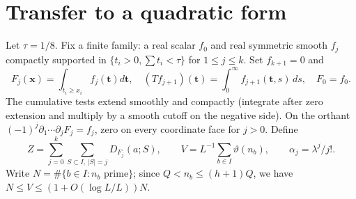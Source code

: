 \documentclass[11pt]{article}
\begin{document}
\section{Transfer to a quadratic form}
Let $\tau=1/8$. Fix a finite family: a real scalar $f_0$ and real
symmetric smooth $f_j$ compactly supported in
$\{t_i>0,\sum t_i<\tau\}$ for $1\le j\le k$. Set $f_{k+1}=0$ and
\[
 F_j(\mathbf x)=\int_{t_i\ge x_i}f_j(\mathbf t)d\mathbf t,\quad
 (Tf_{j+1})(\mathbf t)=\int_0^\infty f_{j+1}(\mathbf t,s)\,ds,
 \quad F_0=f_0.
\]
The cumulative tests extend smoothly and compactly (integrate after
zero extension and multiply by a smooth cutoff on the negative side).
On the orthant $(-1)^j\partial_1\cdots\partial_jF_j=f_j$, zero on
every coordinate face for $j>0$. Define
\[
 Z=\sum_{j=0}^k\sum_{S\subset I,\,|S|=j}D_{F_j}(a;S),\qquad
 V=L^{-1}\sum_{b\in I}\vartheta(n_b),\qquad \alpha_j=\lambda^j/j!.
\]
Write $N=\#\{b\in I:n_b\text{ prime}\}$; since
$Q<n_b\le(h+1)Q$, we have $N\le V\le(1+O(\log L/L))N$.
\end{document}
